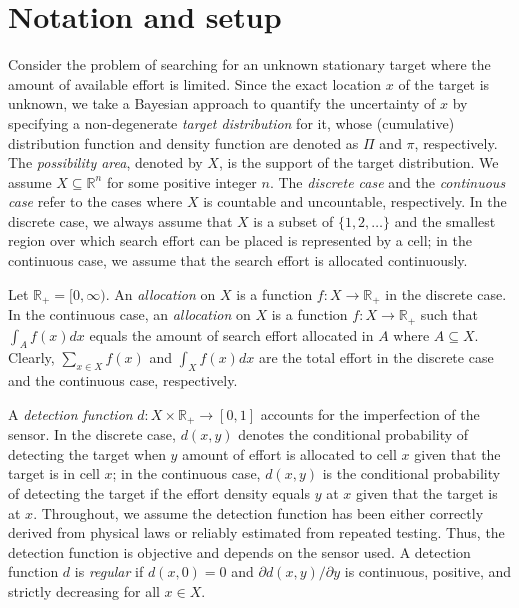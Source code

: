 \documentclass[12pt]{article}
\theoremstyle{plain}
\theoremstyle{definition}
\theoremstyle{remark}
\begin{document}
\section{Notation and setup}
Consider the problem of searching for an unknown stationary target where the amount of available effort is limited.  Since the exact location $x$ of the target is unknown, we take a Bayesian approach to quantify the uncertainty of $x$ by specifying a non-degenerate \emph{target distribution} for it, whose (cumulative) distribution function and density function are denoted as $\Pi$ and $\pi$, respectively.  The \emph{possibility area}, denoted by $X$,  is the support of the target distribution.  We assume $X\subseteq \mathbb{R}^n$ for some positive integer $n$.   The \emph{discrete case} and the \emph{continuous case} refer to the cases where $X$ is countable and uncountable,  respectively.  In the discrete case, we always assume that $X$ is a subset of $\{1, 2, \ldots\}$ and the smallest region over which search effort can be placed is represented by a cell; in the continuous case, we assume that the search effort is allocated continuously.

Let $\mathbb{R}_+=[0, \infty)$. An \emph{allocation} on $X$ is a function $f:X\rightarrow \mathbb{R}_+$ in the discrete case.  In the continuous case,  an \emph{allocation} on $X$ is a function $f:X\rightarrow \mathbb{R}_+$ such that $\int_Af(x)dx$ equals the amount of search effort allocated in $A$ where $A\subseteq X$.   Clearly,  $\sum_{x\in X}f(x)$ and $\int_Xf(x)dx$ are the total effort in the discrete case and the continuous case, respectively. 

A \emph{detection function} $d: X\times \mathbb{R}_+\rightarrow [0, 1]$ accounts for the imperfection of the sensor.
In the discrete case, $d(x, y)$ denotes the conditional probability of detecting the target when $y$ amount of effort is allocated to cell $x$ given that the target is in cell $x$; in the continuous case,   $d(x, y)$ is the conditional probability of detecting the target if the effort density equals $y$ at $x$ given that the target is at $x$.  Throughout, we assume the detection function has been either correctly derived from physical laws or reliably estimated from repeated testing.  
Thus,  the detection function is objective and depends on the sensor used.  A detection function $d$ is \emph{regular} if $d(x, 0)=0$ and $\partial d(x, y)/\partial y$ is continuous, positive, and strictly decreasing for all $x\in X$.  
\end{document}
